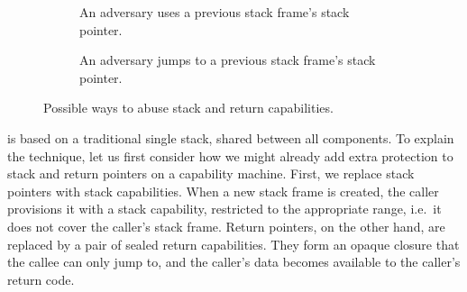 \documentclass[acmsmall,screen]{acmart}\settopmatter{}
\begin{document}
\begin{figure}
\begin{subfigure}{0.4\linewidth}
    \caption{An adversary uses a previous stack frame's stack pointer.}
    \label{fig:stack-ptr-abuse}
  \end{subfigure}
  \begin{subfigure}{0.18\linewidth}
    \phantom{testtestes}
  \end{subfigure}
  \begin{subfigure}{0.4\linewidth}
    \centering
    \caption{An adversary jumps to a previous stack frame's stack pointer.}
    \label{fig:ret-ptr-abuse}
  \end{subfigure}
  
  \caption{Possible ways to abuse stack and return capabilities.}
  \label{fig:stack-ret-ptr-abuse}
\end{figure}

\stktokens{} is based on a traditional single stack, shared between all components.
To explain the technique, let us first consider how we might already add extra protection to stack and return pointers on a capability machine.
First, we replace stack pointers with stack capabilities.
When a new stack frame is created, the caller provisions it with a stack capability, restricted to the appropriate range, i.e.\ it does not cover the caller's stack frame.
Return pointers, on the other hand, are replaced by a pair of sealed return capabilities.
They form an opaque closure that the callee can only jump to, and the caller's data becomes available to the caller's return code. 
\end{document}
